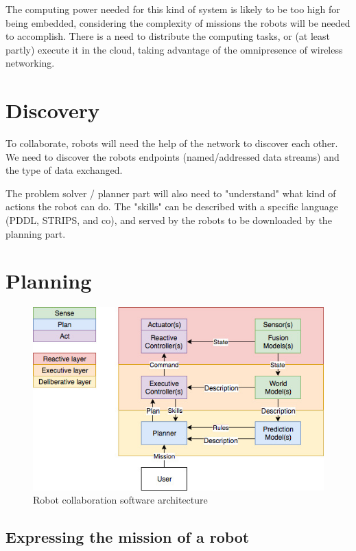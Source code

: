 \documentclass[conference]{IEEEtran}
\begin{document}
The computing power needed for this kind of system is likely to be too high for being embedded, considering the complexity of missions the robots will be needed to accomplish.
There is a need to distribute the computing tasks, or (at least partly) execute it in the cloud, taking advantage of the omnipresence of wireless networking.

\section{Discovery}

To collaborate, robots will need the help of the network to discover each other.
We need to discover the robots endpoints (named/addressed data streams) and the type of data exchanged.

The problem solver / planner part will also need to "understand" what kind of actions the robot can do.
The "skills" can be described with a specific language (PDDL, STRIPS, and co), and served by the robots to be downloaded by the planning part.

\section{Planning}

\begin{figure}
  \centering
  \caption{\label{3layers}Robot collaboration software architecture}
  \includegraphics[scale=0.40]{img/3layers}
\end{figure}

\subsection{Expressing the mission of a robot}
\end{document}
